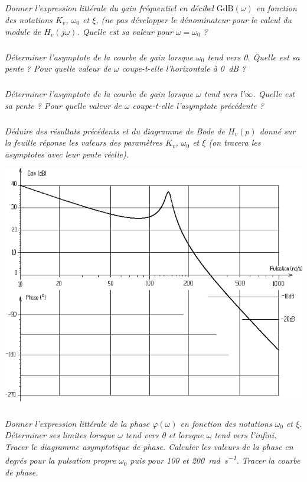 \documentclass[10pt,fleqn]{article} %
\begin{document}
\begin{multicols}{2}
\subparagraph{}\textit{Donner l’expression littérale du gain fréquentiel en décibel $\text{GdB}(\omega)$ en fonction des notations $K_v$, $\omega_0$ et $\xi$, (ne pas développer le dénominateur pour le calcul du module de $H_v(j\omega)$. Quelle est sa valeur pour $\omega=\omega_0$ ?}

\subparagraph{}\textit{Déterminer l’asymptote de la courbe de gain lorsque 
$\omega_0$ tend vers 0. Quelle est sa pente ?
Pour quelle valeur de $\omega$ coupe-t-elle l’horizontale à \SI{0}{dB} ?}

\subparagraph{}\textit{Déterminer l’asymptote de la courbe de gain lorsque $\omega$ tend vers l'$\infty$. Quelle est sa pente ?	
Pour quelle valeur de $\omega$ coupe-t-elle l’asymptote précédente ?}

\subparagraph{}\textit{Déduire des résultats précédents et du diagramme de Bode de $H_v(p)$ donné sur la feuille réponse les valeurs des paramètres $K_v$, $\omega_0$ et $\xi$ (on tracera les asymptotes avec leur pente réelle).}

\begin{center}
\includegraphics[width=\linewidth]{images/fig_02}
\end{center}


\subparagraph{}\textit{Donner l’expression littérale de la phase $\varphi(\omega)$ en fonction des notations $\omega_0$ et $\xi$.	
Déterminer ses limites lorsque $\omega$ tend vers 0 et lorsque $\omega$ tend vers l'infini.	
Tracer le diagramme asymptotique de phase.	
Calculer les valeurs de la phase en degrés pour la pulsation propre $\omega_0$ puis pour \num{100} et \SI{200}{rad.s^{-1}}. Tracer la courbe de phase.}



\end{multicols}
\end{document}
